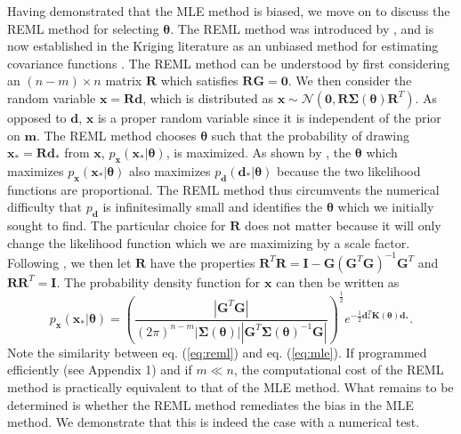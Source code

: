 Having demonstrated that the MLE method is biased, we move on to discuss the REML method for selecting $\mathbf{\theta}$.  The REML method was introduced by \citet{Patterson1971}, and is now established in the Kriging literature as an unbiased method for estimating covariance functions \citep[e.g.,][]{Cressie1992}. The REML method can be understood by first considering an $(n-m)\times n$ matrix $\mathbf{R}$ which satisfies $\mathbf{R}\mathbf{G}=\mathbf{0}$.  We then consider the random variable $\mathbf{x}=\mathbf{R}\mathbf{d}$, which is distributed as $\mathbf{x} \sim \mathcal{N}(\mathbf{0},\mathbf{R}\mathbf{\Sigma}(\mathbf{\theta})\mathbf{R}^T)$.  As opposed to $\mathbf{d}$, $\mathbf{x}$ is a proper random variable since it is independent of the prior on $\mathbf{m}$. The REML method chooses $\mathbf{\theta}$ such that the probability of drawing $\mathbf{x}_*=\mathbf{R}\mathbf{d}_*$ from $\mathbf{x}$, $p_\mathbf{x}(\mathbf{x}_*|\mathbf{\theta})$, is maximized. As shown by \citet{Harville1974}, the $\mathbf{\theta}$ which maximizes $p_\mathbf{x}(\mathbf{x}_*|\mathbf{\theta})$ also maximizes $p_\mathbf{d}(\mathbf{d}_*|\mathbf{\theta})$ because the two likelihood functions are proportional. The REML method thus circumvents the numerical difficulty that $p_\mathbf{d}$ is infinitesimally small and identifies the $\mathbf{\theta}$ which we initially sought to find. The particular choice for $\mathbf{R}$ does not matter because it will only change the likelihood function which we are maximizing by a scale factor. Following \citet{Harville1974}, we then let $\mathbf{R}$ have the properties $\mathbf{R}^T\mathbf{R} = \mathbf{I} - \mathbf{G}(\mathbf{G}^T\mathbf{G})^{-1}\mathbf{G}^T$ and $\mathbf{R}\mathbf{R}^T = \mathbf{I}$. The probability density function for $\mathbf{x}$ can then be written as 
\begin{equation}\label{eq:reml}
p_\mathbf{x}(\mathbf{x}_*|\mathbf{\theta}) =
\left(\frac{\left|\mathbf{G}^T\mathbf{G}\right|}
           {(2\pi)^{n-m}
            \left| \mathbf{\Sigma}(\mathbf{\theta}) \right| 
            \left| \mathbf{G}^T\mathbf{\Sigma}(\mathbf{\theta})^{-1}\mathbf{G} \right|}\right)^{\frac{1}{2}} 
e^{-\tfrac{1}{2}\mathbf{d}_*^T\mathbf{K}(\mathbf{\theta})\mathbf{d}_*}.
\end{equation}
Note the similarity between eq. (\ref{eq:reml}) and eq. (\ref{eq:mle}). If programmed efficiently (see Appendix 1) and if $m \ll n$, the computational cost of the REML method is practically equivalent to that of the MLE method. What remains to be determined is whether the REML method remediates the bias in the MLE method. We demonstrate that this is indeed the case with a numerical test. 

